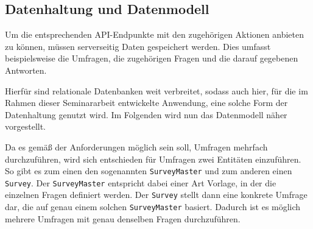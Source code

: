
\subsection{Datenhaltung und Datenmodell}
Um die entsprechenden \acs{API}-Endpunkte mit den zugehörigen Aktionen anbieten zu können, müssen serverseitig Daten gespeichert werden.
Dies umfasst beispielsweise die Umfragen, die zugehörigen Fragen und die darauf gegebenen Antworten.

Hierfür sind relationale Datenbanken weit verbreitet, sodass auch hier, für die im Rahmen dieser Seminararbeit entwickelte Anwendung, eine solche Form der Datenhaltung genutzt wird.
Im Folgenden wird nun das Datenmodell näher vorgestellt.

Da es gemäß der Anforderungen möglich sein soll, Umfragen mehrfach durchzuführen, wird sich entschieden für Umfragen zwei Entitäten einzuführen.
So gibt es zum einen den sogenannten \texttt{SurveyMaster} und zum anderen einen \texttt{Survey}.
Der \texttt{SurveyMaster} entspricht dabei einer Art Vorlage, in der die einzelnen Fragen definiert werden.
Der \texttt{Survey} stellt dann eine konkrete Umfrage dar, die auf genau einem solchen \texttt{SurveyMaster} basiert.
Dadurch ist es möglich mehrere Umfragen mit genau denselben Fragen durchzuführen.


